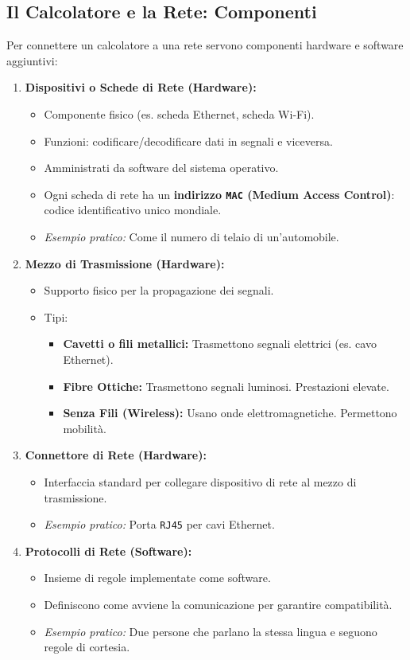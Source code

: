 \subsection{Il Calcolatore e la Rete: Componenti}
Per connettere un calcolatore a una rete servono componenti hardware e software aggiuntivi:
\begin{enumerate}
    \item \textbf{Dispositivi o Schede di Rete (Hardware):}
    \begin{itemize}
        \item Componente fisico (es. scheda Ethernet, scheda Wi-Fi).
        \item Funzioni: codificare/decodificare dati in segnali e viceversa.
        \item Amministrati da software del sistema operativo.
        \item Ogni scheda di rete ha un \textbf{indirizzo \texttt{MAC} (Medium Access Control)}: codice identificativo unico mondiale.
        \item \textit{Esempio pratico:} Come il numero di telaio di un'automobile.
    \end{itemize}
    \item \textbf{Mezzo di Trasmissione (Hardware):}
    \begin{itemize}
        \item Supporto fisico per la propagazione dei segnali.
        \item Tipi:
        \begin{itemize}
            \item \textbf{Cavetti o fili metallici:} Trasmettono segnali elettrici (es. cavo Ethernet).
            \item \textbf{Fibre Ottiche:} Trasmettono segnali luminosi. Prestazioni elevate.
            \item \textbf{Senza Fili (Wireless):} Usano onde elettromagnetiche. Permettono mobilità.
        \end{itemize}
    \end{itemize}
    \item \textbf{Connettore di Rete (Hardware):}
    \begin{itemize}
        \item Interfaccia standard per collegare dispositivo di rete al mezzo di trasmissione.
        \item \textit{Esempio pratico:} Porta \texttt{RJ45} per cavi Ethernet.
    \end{itemize}
    \item \textbf{Protocolli di Rete (Software):}
    \begin{itemize}
        \item Insieme di regole implementate come software.
        \item Definiscono come avviene la comunicazione per garantire compatibilità.
        \item \textit{Esempio pratico:} Due persone che parlano la stessa lingua e seguono regole di cortesia.
    \end{itemize}
\end{enumerate}

